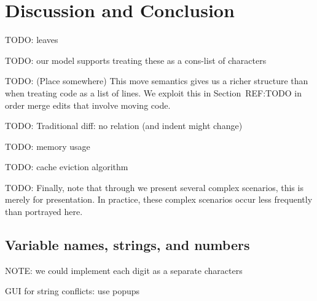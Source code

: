 
\section{Discussion and Conclusion}%
\label{sec:Discussion and Conclusion}

TODO: leaves

TODO: our model supports treating these as a cons-list of characters

TODO: (Place somewhere) This move semantics gives us a richer structure than
when treating code as a list of lines.  We exploit
this in Section~REF:TODO in order merge edits that involve moving code.

TODO: Traditional diff: no relation (and indent might change)

TODO: memory usage

TODO: cache eviction algorithm

TODO: Finally, note that through we present several complex scenarios, this is merely for presentation.
In practice, these complex scenarios occur less frequently than portrayed here.

\subsection{Variable names, strings, and numbers}%
\label{sub:Variable names, strings, and numbers}

NOTE: we could implement each digit as a separate characters

GUI for string conflicts: use popups
